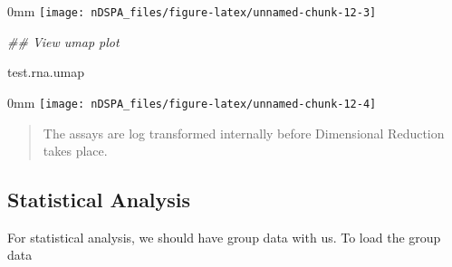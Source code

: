 \documentclass[]{article}
\newcommand{\hlcom}[1]{\textcolor[rgb]{0.502,0.502,0.502}{\textit{#1}}}%
\newcommand{\hlstd}[1]{\textcolor[rgb]{0.251,0.251,0.251}{#1}}%
\newenvironment{Shaded}{\begin{myshaded}}{\end{myshaded}}
\newcommand{\DocumentationTok}[1]{\hlcom{#1}}
\newcommand{\NormalTok}[1]{\hlstd{#1}}
\begin{document}
\begin{adjustwidth}{\fltoffset}{0mm}
\texttt{[image: nDSPA\_files/figure-latex/unnamed-chunk-12-3]} \end{adjustwidth}

\begin{Shaded}
\begin{Highlighting}[]

\DocumentationTok{\#\# View umap plot}

\NormalTok{test.rna.umap}
\end{Highlighting}
\end{Shaded}

\begin{adjustwidth}{\fltoffset}{0mm}
\texttt{[image: nDSPA\_files/figure-latex/unnamed-chunk-12-4]} \end{adjustwidth}

\begin{quote}
The assays are log transformed internally before Dimensional Reduction takes
place.
\end{quote}

\hypertarget{statistical-analysis}{%
\subsection{Statistical Analysis}\label{statistical-analysis}}

For statistical analysis, we should have group data with us. To load the group
data
\end{document}
